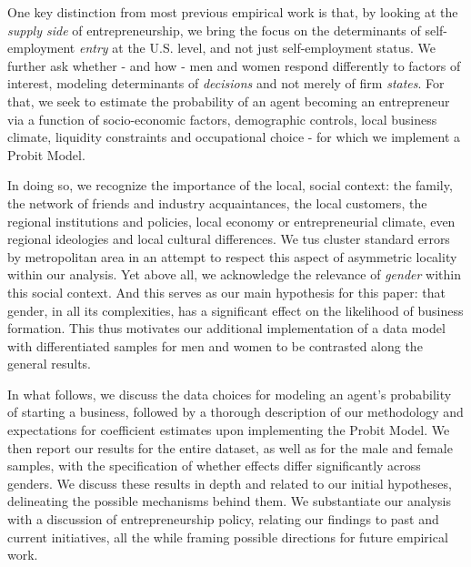 One key distinction from most previous empirical work is that, by looking at the \textit{supply side} of entrepreneurship, we bring the focus on the determinants of self-employment \textit{entry} at the U.S. level, and not just self-employment status. We further ask whether - and how - men and women respond differently to factors of interest, modeling determinants of \textit{decisions} and not merely of firm \textit{states}. For that, we seek to estimate the probability  of an agent becoming an entrepreneur via a function of socio-economic factors, demographic controls, local business climate, liquidity constraints and occupational choice - for which we implement a Probit Model. 

In doing so, we recognize the importance of the local, social context: the family, the network of friends and industry acquaintances, the local customers, the regional institutions and policies, local economy or entrepreneurial climate, even regional ideologies and local cultural differences. We tus cluster standard errors by metropolitan area in an attempt to respect this aspect of asymmetric locality within our analysis. Yet above all, we acknowledge the relevance of \textit{gender} within this social context. And this serves as our main hypothesis for this paper: that gender, in all its complexities,  has a significant effect on the likelihood of business formation. This thus motivates our additional implementation of a data model with differentiated samples for men and women to be contrasted along the general results. 

In what follows, we discuss the data choices for modeling an agent’s probability of starting a business, followed by a thorough description of our methodology and expectations for coefficient estimates upon implementing the Probit Model.  We then report our results for the entire dataset, as well as for the male and female samples, with the specification of whether effects differ significantly across genders. We discuss these results in depth and related to our initial hypotheses, delineating the possible mechanisms behind them. We substantiate our analysis with a discussion of entrepreneurship policy, relating our findings to past and current initiatives, all the while framing possible directions for future empirical work. 
